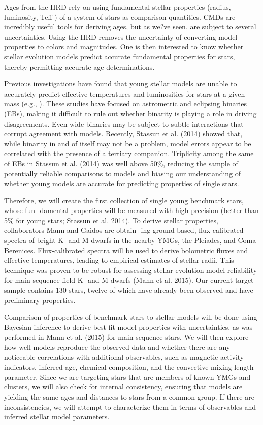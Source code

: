 \documentclass[12pt,a4paper]{article}
\begin{document}
Ages from the HRD rely on using fundamental stellar properties (radius, luminosity, Teff ) of a system of stars as comparison quantities. CMDs are incredibly useful tools for deriving ages, but as we?ve seen, are subject to several uncertainties. Using the HRD removes the uncertainty of converting model properties to colors and magnitudes. One is then interested to know whether stellar evolution models predict accurate fundamental properties for stars, thereby permitting accurate age determinations.

Previous investigations have found that young stellar models are unable to accurately predict effective temperatures and luminosities for stars at a given mass (e.g., ). These studies have focused on astrometric and eclipsing binaries (EBs), making it difficult to rule out whether binarity is playing a role in driving disagreements. Even wide binaries may be subject to subtle interactions that corrupt agreement with models. Recently, Stassun et al. (2014) showed that, while binarity in and of itself may not be a problem, model errors appear to be correlated with the presence of a tertiary companion. Triplicity among the same of EBs in Stassun et al. (2014) was well above 50\%, reducing the sample of potentially reliable comparisons to models and biasing our understanding of whether young models are accurate for predicting properties of single stars.

Therefore, we will create the first collection of single young benchmark stars, whose fun- damental properties will be measured with high precision (better than 5\% for young stars; Stassun et al. 2014). To derive stellar properties, collaborators Mann and Gaidos are obtain- ing ground-based, flux-calibrated spectra of bright K- and M-dwarfs in the nearby YMGs, the Pleiades, and Coma Berenices. Flux-calibrated spectra will be used to derive bolometric fluxes and effective temperatures, leading to empirical estimates of stellar radii. This technique was proven to be robust for assessing stellar evolution model reliability for main sequence field K- and M-dwarfs (Mann et al. 2015). Our current target sample contains 130 stars, twelve of which have already been observed and have preliminary properties.

Comparison of properties of benchmark stars to stellar models will be done using Bayesian inference to derive best fit model properties with uncertainties, as was performed in Mann et al. (2015) for main sequence stars. We will then explore how well models reproduce the observed data and whether there are any noticeable correlations with additional observables, such as magnetic activity indicators, inferred age, chemical composition, and the convective mixing length parameter. Since we are targeting stars that are members of known YMGs and clusters, we will also check for internal consistency, ensuring that models are yielding the same ages and distances to stars from a common group. If there are inconsistencies, we will attempt to characterize them in terms of observables and inferred stellar model parameters.
\end{document}
